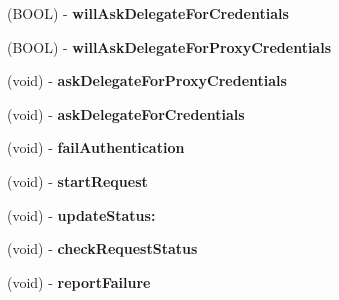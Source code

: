 \begin{DoxyCompactItemize}
\item 
\hypertarget{interface_a_s_i_h_t_t_p_request_07_08_a2fb19d10e5d6449c7845042add6dc2a1}{
(\-B\-O\-O\-L) -\/ {\bfseries will\-Ask\-Delegate\-For\-Credentials}}
\label{interface_a_s_i_h_t_t_p_request_07_08_a2fb19d10e5d6449c7845042add6dc2a1}

\item 
\hypertarget{interface_a_s_i_h_t_t_p_request_07_08_a52ecd8ea9d13c585c86a7f9031f1d2e8}{
(\-B\-O\-O\-L) -\/ {\bfseries will\-Ask\-Delegate\-For\-Proxy\-Credentials}}
\label{interface_a_s_i_h_t_t_p_request_07_08_a52ecd8ea9d13c585c86a7f9031f1d2e8}

\item 
\hypertarget{interface_a_s_i_h_t_t_p_request_07_08_a545869781fbd1e24ed126da754536006}{
(void) -\/ {\bfseries ask\-Delegate\-For\-Proxy\-Credentials}}
\label{interface_a_s_i_h_t_t_p_request_07_08_a545869781fbd1e24ed126da754536006}

\item 
\hypertarget{interface_a_s_i_h_t_t_p_request_07_08_a44501e22716b6373457e7f235775662c}{
(void) -\/ {\bfseries ask\-Delegate\-For\-Credentials}}
\label{interface_a_s_i_h_t_t_p_request_07_08_a44501e22716b6373457e7f235775662c}

\item 
\hypertarget{interface_a_s_i_h_t_t_p_request_07_08_aa65e69f36b090b963669094ce4e3ba31}{
(void) -\/ {\bfseries fail\-Authentication}}
\label{interface_a_s_i_h_t_t_p_request_07_08_aa65e69f36b090b963669094ce4e3ba31}

\item 
\hypertarget{interface_a_s_i_h_t_t_p_request_07_08_ae64756aed5b2103d48f7a10c04916c60}{
(void) -\/ {\bfseries start\-Request}}
\label{interface_a_s_i_h_t_t_p_request_07_08_ae64756aed5b2103d48f7a10c04916c60}

\item 
\hypertarget{interface_a_s_i_h_t_t_p_request_07_08_ab0847444e15b9b0263c5bedd8faa151a}{
(void) -\/ {\bfseries update\-Status\-:}}
\label{interface_a_s_i_h_t_t_p_request_07_08_ab0847444e15b9b0263c5bedd8faa151a}

\item 
\hypertarget{interface_a_s_i_h_t_t_p_request_07_08_a068fc55ba6cb87ad880bded7fd78ab27}{
(void) -\/ {\bfseries check\-Request\-Status}}
\label{interface_a_s_i_h_t_t_p_request_07_08_a068fc55ba6cb87ad880bded7fd78ab27}

\item 
\hypertarget{interface_a_s_i_h_t_t_p_request_07_08_af147c15ba579966f7d4793ebe1eb881b}{
(void) -\/ {\bfseries report\-Failure}}
\label{interface_a_s_i_h_t_t_p_request_07_08_af147c15ba579966f7d4793ebe1eb881b}


\end{DoxyCompactItemize}
